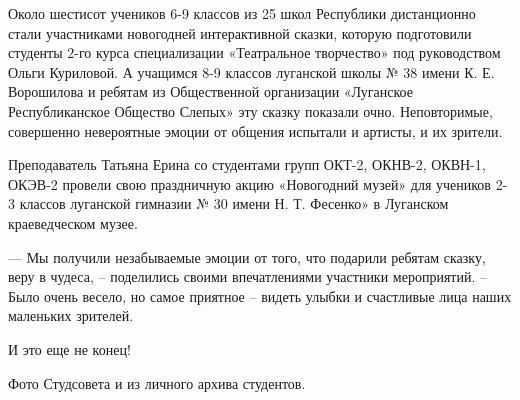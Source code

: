 
Около шестисот учеников 6-9 классов из 25 школ Республики дистанционно стали
участниками новогодней интерактивной сказки, которую подготовили студенты 2-го
курса специализации «Театральное творчество» под руководством Ольги Куриловой.
А учащимся 8-9 классов луганской школы № 38 имени К. Е. Ворошилова и ребятам из
Общественной организации «Луганское Республиканское Общество Слепых» эту сказку
показали очно. Неповторимые, совершенно невероятные эмоции от общения испытали
и артисты, и их зрители.

Преподаватель Татьяна Ерина со студентами групп ОКТ-2, ОКНВ-2, ОКВН-1, ОКЭВ-2
провели свою праздничную акцию «Новогодний музей» для учеников 2-3 классов
луганской гимназии № 30 имени Н. Т. Фесенко» в Луганском краеведческом музее.

— Мы получили незабываемые эмоции от того, что подарили ребятам сказку, веру в
чудеса, – поделились своими впечатлениями участники мероприятий. – Было очень
весело, но самое приятное – видеть улыбки и счастливые лица наших маленьких
зрителей.

И это еще не конец!

Фото Студсовета и из личного архива студентов.
